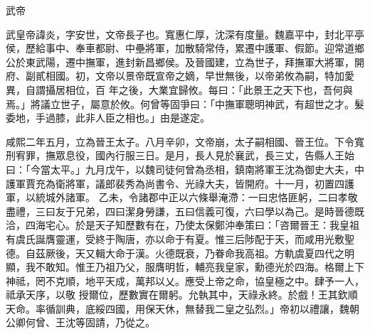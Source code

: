 
\begin{pinyinscope}

 武帝



 武皇帝諱炎，字安世，文帝長子也。寬惠仁厚，沈深有度量。魏嘉平中，封北平亭侯，歷給事中、奉車都尉、中壘將軍，加散騎常侍，累遷中護軍、假節。迎常道鄉公於東武陽，遷中撫軍，進封新昌鄉侯。及晉國建，立為世子，拜撫軍大將軍，開府、副貳相國。初，文帝以景帝既宣帝之嫡，早世無後，以帝弟攸為嗣，特加愛異，自謂攝居相位，百
 年之後，大業宜歸攸。每曰：「此景王之天下也，吾何與焉。」將議立世子，屬意於攸。何曾等固爭曰：「中撫軍聰明神武，有超世之才。髮委地，手過膝，此非人臣之相也。」由是遂定。



 咸熙二年五月，立為晉王太子。八月辛卯，文帝崩，太子嗣相國、晉王位。下令寬刑宥罪，撫眾息役，國內行服三日。是月，長人見於襄武，長三丈，告縣人王始曰：「今當太平。」九月戊午，以魏司徒何曾為丞相，鎮南將軍王沈為御史大夫，中護軍賈充為衛將軍，議郎裴秀為尚書令、光祿大夫，皆開府。十一月，初置四護軍，以統城外諸軍。
 乙未，令諸郡中正以六條舉淹滯：一曰忠恪匪躬，二曰孝敬盡禮，三曰友于兄弟，四曰潔身勞謙，五曰信義可復，六曰學以為己。是時晉德既洽，四海宅心。於是天子知歷數有在，乃使太保鄭沖奉策曰：「咨爾晉王：我皇祖有虞氏誕膺靈運，受終于陶唐，亦以命于有夏。惟三后陟配于天，而咸用光敷聖德。自茲厥後，天又輯大命于漢。火德既衰，乃眷命我高祖。方軌虞夏四代之明顯，我不敢知。惟王乃祖乃父，服膺明哲，輔亮我皇家，勳德光於四海。格爾上下神祗，罔不克順，地平天成，萬邦以乂。應受上帝之命，協皇極之中。肆予一人，祗承天序，以敬
 授爾位，歷數實在爾躬。允執其中，天祿永終。於戲！王其欽順天命。率循訓典，底綏四國，用保天休，無替我二皇之弘烈。」帝初以禮讓，魏朝公卿何曾、王沈等固請，乃從之。




\end{pinyinscope}
